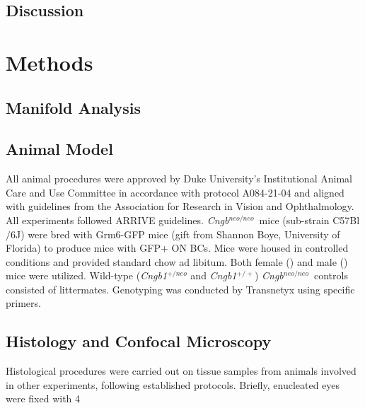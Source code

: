 \documentclass[11pt, a4paper]{article}
\newcommand{\cngb}{\textit{Cngb$^{neo/neo}$}~}
\begin{document}





\subsection*{Discussion}



\section*{Methods}

\subsection*{Manifold Analysis}

\subsection*{Animal Model}
All animal procedures were approved by Duke University's Institutional Animal Care and Use Committee in accordance with protocol A084-21-04 and aligned with guidelines from the Association for Research in Vision and Ophthalmology. All experiments followed ARRIVE guidelines. \cngb mice (sub-strain C57Bl$/$6J) were bred with Grm6-GFP mice (gift from Shannon Boye, University of Florida) to produce mice with GFP+ ON BCs. Mice were housed in controlled conditions and provided standard chow ad libitum. Both female () and male () mice were utilized. Wild-type (\textit{Cngb1$^{+/neo}$} and \textit{Cngb1$^{+/+}$}) \cngb controls consisted of littermates. Genotyping was conducted by Transnetyx using specific primers. 

\subsection*{Histology and Confocal Microscopy}
Histological procedures were carried out on tissue samples from animals involved in other experiments, following established protocols. Briefly, enucleated eyes were fixed with 4%
\end{document}
